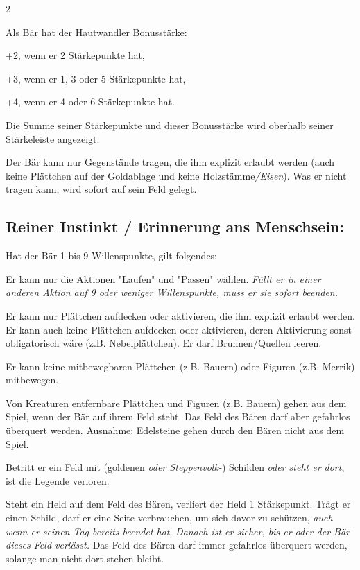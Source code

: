 \documentclass[10pt, a4paper, oneside]{book}
\newcommand{\fan}[1]{\textit{#1}}
\begin{document}
\begin{multicols*}{2}
\begin{nobgcolor}
Als Bär hat der Hautwandler \hyperref[Bonusstärke]{Bonusstärke}:

\bullet{} +2, wenn er 2 Stärkepunkte hat,

\bullet{} +3, wenn er 1, 3 oder 5 Stärkepunkte hat,

\bullet{} +4, wenn er 4 oder 6 Stärkepunkte hat.

Die Summe seiner Stärkepunkte und dieser \hyperref[Bonusstärke]{Bonusstärke} wird oberhalb seiner Stärkeleiste angezeigt.


Der Bär kann nur Gegenstände tragen, die ihm explizit erlaubt werden (auch keine Plättchen auf der Goldablage\supercite{DH:FAQ} und keine Holzstämme\supercite{46402}\fan{/Eisen}). Was er nicht tragen kann, wird sofort auf sein Feld gelegt.





\subsection{Reiner Instinkt / Erinnerung ans Menschsein:}

Hat der Bär 1 bis 9 Willenspunkte, gilt folgendes:

Er kann nur die Aktionen "Laufen" und "Passen" wählen.
\supercite{46612,DH:Bär}
\fan{Fällt er in einer anderen Aktion auf 9 oder weniger Willenspunkte, muss er sie sofort beenden.}

\bullet{} Er kann nur Plättchen aufdecken oder aktivieren, die ihm explizit erlaubt werden. Er kann auch keine Plättchen aufdecken oder aktivieren, deren Aktivierung sonst obligatorisch wäre (z.B. Nebelplättchen). Er darf Brunnen/Quellen leeren.
\supercite{DH:Bär}

\bullet{} Er kann keine mitbewegbaren Plättchen (z.B. Bauern) oder Figuren (z.B. Merrik) mitbewegen\supercite{AG:Begleitheft,DZ:Begleitheft}.

\bullet{} Von Kreaturen entfernbare Plättchen und Figuren (z.B. Bauern) gehen aus dem Spiel, wenn der Bär auf ihrem Feld steht. Das Feld des Bären darf aber gefahrlos überquert werden.
\supercite{DH:Bär,DH:Begleitheft}
Ausnahme: Edelsteine gehen durch den Bären nicht aus dem Spiel.

\bullet{} Betritt er ein Feld mit (goldenen \fan{oder Steppenvolk-}) Schilden \fan{oder steht er dort}, ist die Legende verloren. 
\supercite{DH:Bär,DZ:Begleitheft}

\bullet{} Steht ein Held auf dem Feld des Bären, verliert der Held 1 Stärkepunkt. Trägt er einen Schild, darf er eine Seite verbrauchen, um sich davor zu schützen, \fan{auch wenn er seinen Tag bereits beendet hat}. \fan{Danach ist er sicher, bis er oder der Bär dieses Feld verlässt.}
Das Feld des Bären darf immer gefahrlos überquert werden, solange man nicht dort stehen bleibt.
\supercite{DH:Bär,DH:Begleitheft,46300} 



\end{nobgcolor}
\end{multicols*}
\end{document}
